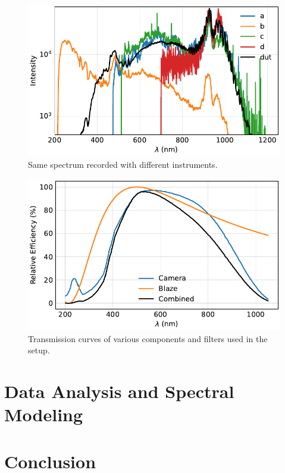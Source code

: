 \documentclass[
	parskip=half,
	a4paper,
]{scrarticle}
\begin{document}
\begin{figure}
    \centering
    \includegraphics{../analysis/figures/efficiency_different.pdf}
    \caption{Same spectrum recorded with different instruments.}
\end{figure}


\begin{figure}
    \centering
    \includegraphics{../analysis/figures/expected.pdf}
    \caption{Transmission curves of various components and filters used in the setup.}
    \label{fig:transmission}
\end{figure}

\clearpage
\section{Data Analysis and Spectral Modeling}

\clearpage
\section{Conclusion}

\clearpage
\printbibliography
\end{document}
